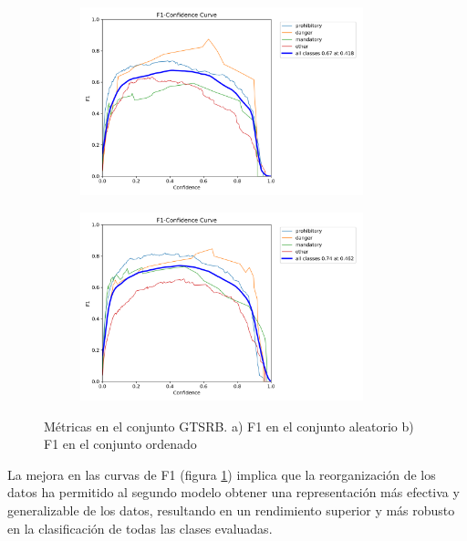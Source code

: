 \documentclass{article}
\begin{document}
\begin{figure}[h]
\begin{subfigure}[b]{0.5\textwidth}
\centering
\includegraphics[width=0.9\textwidth]{resources/random cuban F1 curve.png}
\caption{}
\end{subfigure}
\begin{subfigure}[b]{0.5\textwidth}
\centering
\includegraphics[width=0.9\textwidth]{resources/sim cuban F1 curve.png}
\caption{}
\end{subfigure}
\caption{Métricas en el conjunto GTSRB. a) F1 en el conjunto aleatorio b) F1 en el conjunto ordenado}
\label{fig:f1 random vs f1 sim}
\end{figure}

La mejora en las curvas de F1 (figura \ref{fig:f1 random vs f1 sim}) implica que la reorganización de los datos ha permitido al segundo modelo obtener una representación más efectiva y generalizable de los datos, resultando en un rendimiento superior y más robusto en la clasificación de todas las clases evaluadas.
\end{document}
